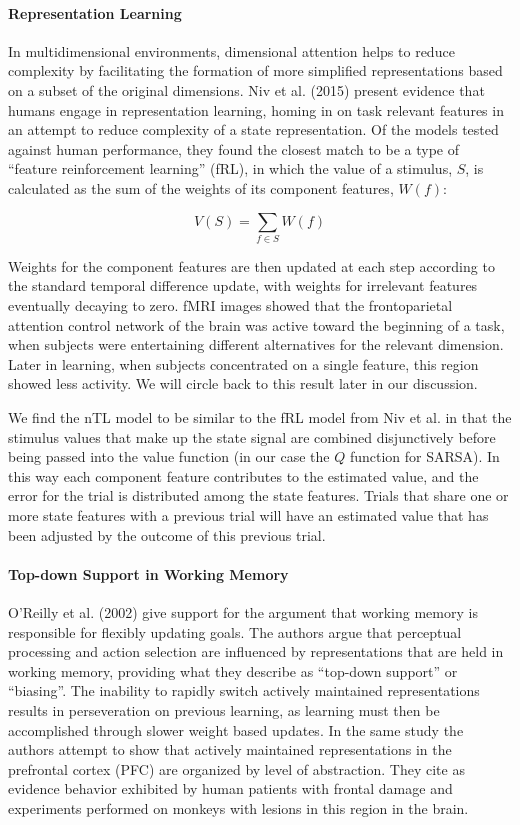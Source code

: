 \documentclass[10pt,letterpaper]{article}
\begin{document}
\paragraph{Representation Learning}

In multidimensional environments, dimensional attention helps to reduce complexity by facilitating the formation of more simplified representations based on a subset of the original dimensions. Niv et al. (2015) present evidence that humans engage in representation learning, homing in on task relevant features in an attempt to reduce complexity of a state representation. Of the models tested against human performance, they found the closest match to be a type of ``feature reinforcement learning'' (fRL), in which the value of a stimulus, $S$, is calculated as the sum of the weights of its component features, $W(f)$: 

\begin{equation}
V(S) = \sum_{f \in S} W(f)
\label{eq:fRL}
\end{equation}

\noindent Weights for the component features are then updated at each step according to the standard temporal difference update, with weights for irrelevant features eventually decaying to zero. fMRI images showed that the frontoparietal attention control network of the brain was active toward the beginning of a task, when subjects were entertaining different alternatives for the relevant dimension. Later in learning, when subjects concentrated on a single feature, this region showed less activity. We will circle back to this result later in our discussion.

We find the nTL model to be similar to the fRL model from Niv et al. in that the stimulus values that make up the state signal are combined disjunctively before being passed into the value function (in our case the $ Q $ function for SARSA). In this way each component feature contributes to the estimated value, and the error for the trial is distributed among the state features. Trials that share one or more state features with a previous trial will have an estimated value that has been adjusted by the outcome of this previous trial. 

\paragraph{Top-down Support in Working Memory}

O'Reilly et al. (2002) give support for the argument that working memory is responsible for flexibly updating goals. The authors argue that perceptual processing and action selection are influenced by representations that are held in working memory, providing what they describe as ``top-down support'' or ``biasing''. The inability to rapidly switch actively maintained representations results in perseveration on previous learning, as learning must then be accomplished through slower weight based updates. In the same study the authors attempt to show that actively maintained representations in the prefrontal cortex (PFC) are organized by level of abstraction. They cite as evidence behavior exhibited by human patients with frontal damage and experiments performed on monkeys with lesions in this region in the brain.
\end{document}
